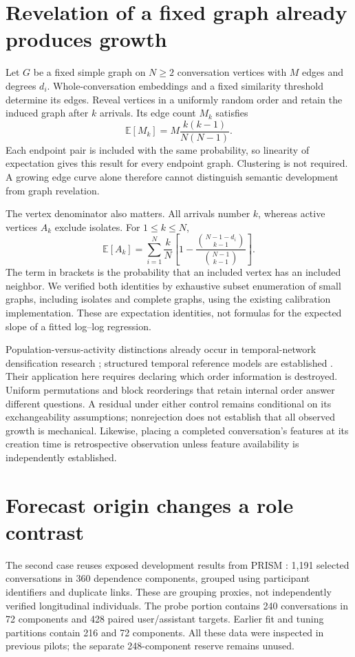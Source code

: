\documentclass{iscs}
\begin{document}
\section{Revelation of a fixed graph already produces growth}
Let $G$ be a fixed simple graph on $N\geq2$ conversation vertices with $M$ edges
and degrees $d_i$. Whole-conversation embeddings and a fixed similarity threshold
determine its edges. Reveal vertices in a uniformly random order and retain
the induced graph after $k$ arrivals. Its edge count $M_k$ satisfies
\begin{equation}
\mathbb{E}[M_k]=M\frac{k(k-1)}{N(N-1)}.
\label{eq:edges}
\end{equation}
Each endpoint pair is included with the same probability, so linearity of
expectation gives this result for every endpoint graph. Clustering is not
required. A growing edge curve alone therefore cannot distinguish semantic
development from graph revelation.

The vertex denominator also matters. All arrivals number $k$, whereas active
vertices $A_k$ exclude isolates. For $1\leq k\leq N$,
\begin{equation}
\mathbb{E}[A_k]=\sum_{i=1}^{N}\frac{k}{N}
\left[1-\frac{\binom{N-1-d_i}{k-1}}{\binom{N-1}{k-1}}\right].
\label{eq:active}
\end{equation}
The term in brackets is the probability that an included vertex has an included
neighbor. We verified both identities by exhaustive subset enumeration of
small graphs, including isolates and complete graphs, using the existing
calibration implementation. These are expectation identities, not formulas
for the expected slope of a fitted log--log regression.

Population-versus-activity distinctions already occur in temporal-network
densification research \cite{kobayashi2020}; structured temporal reference
models are established \cite{gauvin2022}. Their application here requires
declaring which order information is destroyed. Uniform permutations and
block reorderings that retain internal order answer different questions. A residual
under either control remains conditional on its exchangeability assumptions;
nonrejection does not establish that all observed growth is mechanical.
Likewise, placing a completed conversation's features at its creation time is
retrospective observation unless feature availability is independently established.

\section{Forecast origin changes a role contrast}
The second case reuses exposed development results from PRISM
\cite{kirk2024}: 1,191 selected conversations in 360 dependence components,
grouped using participant identifiers and duplicate links. These are grouping
proxies, not independently verified longitudinal individuals. The probe portion
contains 240 conversations in 72 components and 428 paired user/assistant
targets. Earlier fit and tuning partitions contain 216 and 72 components.
All these data were inspected in previous pilots; the separate 248-component
reserve remains unused.
\end{document}
